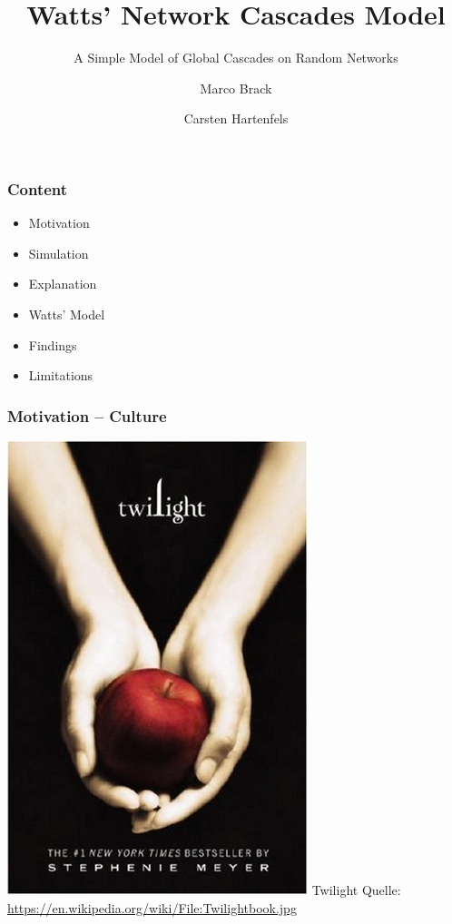 \documentclass[slidestop,usenames,dvipsnames]{beamer}
\title{Watts' Network Cascades Model}
\subtitle{A Simple Model of Global Cascades on Random Networks}
\author{Marco Brack \and Carsten Hartenfels}
\newcommand{\gitem}{\vfill\item}
\begin{document}
\begin{frame}
    \titlepage
\end{frame}




\begin{frame}
    \frametitle{Content}
    \begin{itemize}
        \gitem Motivation
        \gitem Simulation
        \gitem Explanation
        \gitem Watts' Model
        \gitem Findings
        \gitem Limitations
    \end{itemize}
    \vfill
\end{frame}


\begin{frame}
    \frametitle{Motivation -- Culture}
    \begin{center}
        \includegraphics[height=0.65\textheight]{img/twilight}
        \vfill\vspace{8pt}
        {\huge Twilight}
        \vfill\vspace{8pt}
        {\small Quelle: \url{https://en.wikipedia.org/wiki/File:Twilightbook.jpg}}
    \end{center}
    \vfill
\end{frame}
\end{document}
